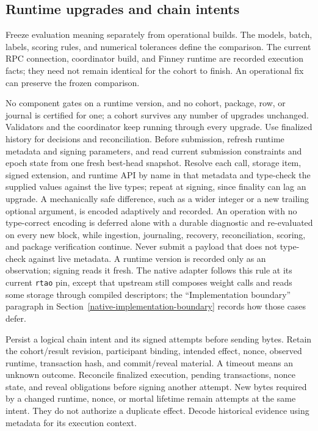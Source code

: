 \subsection{Runtime upgrades and chain intents}

Freeze evaluation meaning separately from operational builds. The models,
batch, labels, scoring rules, and numerical tolerances define the comparison.
The current RPC connection, coordinator build, and Finney runtime are recorded
execution facts; they need not remain identical for the cohort to finish. An
operational fix can preserve the frozen comparison.

No component gates on a runtime version, and no cohort, package, row, or journal
is certified for one; a cohort survives any number of upgrades unchanged.
Validators and the coordinator keep running through every upgrade. Use
finalized history for decisions and reconciliation. Before submission, refresh
runtime metadata and signing parameters, and read current submission
constraints and epoch state from one fresh best-head snapshot. Resolve each
call, storage item, signed extension, and runtime API by name in that metadata
and type-check the supplied values against the live types; repeat at signing,
since finality can lag an upgrade. A mechanically safe difference, such as a
wider integer or a new trailing optional argument, is encoded adaptively and
recorded. An operation with no type-correct encoding is deferred alone with a
durable diagnostic and re-evaluated on every new block, while ingestion,
journaling, recovery, reconciliation, scoring, and package verification
continue. Never submit a payload that does not type-check against live metadata.
A runtime version is recorded only as an observation; signing reads it fresh.
The native adapter follows this rule at its current \texttt{rtao} pin, except that
upstream still composes weight calls and reads some storage through compiled
descriptors; the ``Implementation boundary'' paragraph in
Section~\ref{native-implementation-boundary} records how those cases defer.

Persist a logical chain intent and its signed attempts before sending bytes.
Retain the cohort/result revision, participant binding, intended effect, nonce,
observed runtime, transaction hash, and commit/reveal material. A timeout means
an unknown outcome. Reconcile finalized execution, pending transactions, nonce
state, and reveal obligations before signing another attempt. New bytes required
by a changed runtime, nonce, or mortal lifetime remain attempts at the same
intent. They do not authorize a duplicate effect. Decode historical evidence
using metadata for its execution context.

